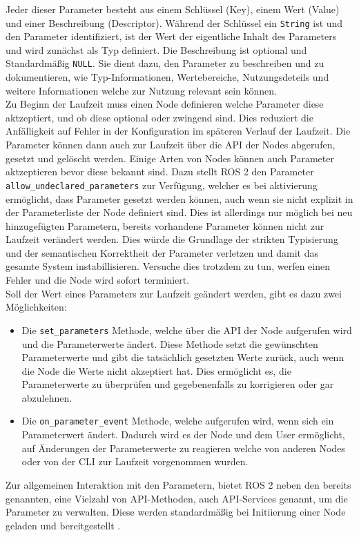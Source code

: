 \noindent
Jeder dieser Parameter besteht aus einem Schlüssel (Key), einem Wert (Value) und einer Beschreibung (Descriptor). Während der Schlüssel ein \texttt{String} ist und den Parameter identifiziert, ist der Wert der eigentliche Inhalt des Parameters und wird zunächst als Typ definiert. Die Beschreibung ist optional und Standardmäßig \texttt{NULL}. Sie dient dazu, den Parameter zu beschreiben und zu dokumentieren, wie Typ-Informationen, Wertebereiche, Nutzungsdeteils und weitere Informationen welche zur Nutzung relevant sein können.
\\

\noindent
Zu Beginn der Laufzeit muss einen Node definieren welche Parameter diese aktzeptiert, und ob diese optional oder zwingend sind. Dies reduziert die Anfälligkeit auf Fehler in der Konfiguration im späteren Verlauf der Laufzeit. Die Parameter können dann auch zur Laufzeit über die \ac{API} der Nodes abgerufen, gesetzt und gelöscht werden. Einige Arten von Nodes können auch Parameter aktzeptieren bevor diese bekannt sind. Dazu stellt \ac{ROS} 2 den Parameter \texttt{allow\_undeclared\_parameters} zur Verfügung, welcher es bei aktivierung ermöglicht, dass Parameter gesetzt werden können, auch wenn sie nicht explizit in der Parameterliste der Node definiert sind. Dies ist allerdings nur möglich bei neu hinzugefügten Parametern, bereits vorhandene Parameter können nicht zur Laufzeit verändert werden. Dies würde die Grundlage der strikten Typisierung und der semantischen Korrektheit der Parameter verletzen und damit das gesamte System instabillisieren. Versuche dies trotzdem zu tun, werfen einen Fehler und die Node wird sofort terminiert.
\\

\noindent
Soll der Wert eines Parameters zur Laufzeit geändert werden, gibt es dazu zwei Möglichkeiten:
\\

\noindent
\begin{itemize}
    \item Die \texttt{set\_parameters} Methode, welche über die \ac{API} der Node aufgerufen wird und die Parameterwerte ändert. Diese Methode setzt die gewünschten Parameterwerte und gibt die tatsächlich gesetzten Werte zurück, auch wenn die Node die Werte nicht akzeptiert hat. Dies ermöglicht es, die Parameterwerte zu überprüfen und gegebenenfalls zu korrigieren oder gar abzulehnen.
\\

\noindent
    \item Die \texttt{on\_parameter\_event} Methode, welche aufgerufen wird, wenn sich ein Parameterwert ändert. Dadurch wird es der Node und dem User ermöglicht, auf Änderungen der Parameterwerte zu reagieren welche von anderen Nodes oder von der \ac{CLI} zur Laufzeit vorgenommen wurden.\\
\end{itemize}
Zur allgemeinen Interaktion mit den Parametern, bietet \ac{ROS} 2 neben den bereits genannten, eine Vielzahl von \ac{API}-Methoden, auch \ac{API}-Services genannt, um die Parameter zu verwalten. Diese werden standardmäßig bei Initiierung einer Node geladen und bereitgestellt \cite{ROSParameters}.\\

